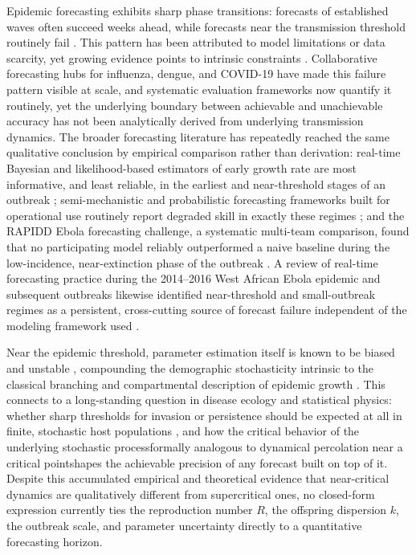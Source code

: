 \documentclass[review]{elsarticle}
\theoremstyle{plain}
\theoremstyle{definition}
\begin{document}
Epidemic forecasting exhibits sharp phase transitions: forecasts of established waves often succeed weeks ahead, while forecasts near the transmission threshold routinely fail \citep{scarpino2019predictability, reich2019collaborative}. This pattern has been attributed to model limitations or data scarcity, yet growing evidence points to intrinsic constraints \citep{farrow2017information, perofsky2017forecasting}. Collaborative forecasting hubs for influenza, dengue, and COVID-19 \citep{mcgowan2019collaborative, johansson2019open, cramer2022evaluation} have made this failure pattern visible at scale, and systematic evaluation frameworks \citep{bracher2021evaluating} now quantify it routinely, yet the underlying boundary between achievable and unachievable accuracy has not been analytically derived from underlying transmission dynamics. The broader forecasting literature has repeatedly reached the same qualitative conclusion by empirical comparison rather than derivation: real-time Bayesian and likelihood-based estimators of early growth rate are most informative, and least reliable, in the earliest and near-threshold stages of an outbreak \citep{bettencourt2008real, white2008likelihood, fraser2007estimating}; semi-mechanistic and probabilistic forecasting frameworks built for operational use routinely report degraded skill in exactly these regimes \citep{funk2018realtime, held2017probabilistic}; and the RAPIDD Ebola forecasting challenge, a systematic multi-team comparison, found that no participating model reliably outperformed a naive baseline during the low-incidence, near-extinction phase of the outbreak \citep{viboud2018rapidd}. A review of real-time forecasting practice during the 2014--2016 West African Ebola epidemic and subsequent outbreaks likewise identified near-threshold and small-outbreak regimes as a persistent, cross-cutting source of forecast failure independent of the modeling framework used \citep{desai2019realtime}.

Near the epidemic threshold, parameter estimation itself is known to be biased and unstable \citep{britton2019estimation}, compounding the demographic stochasticity intrinsic to the classical branching and compartmental description of epidemic growth \citep{kermack1927contribution}. This connects to a long-standing question in disease ecology and statistical physics: whether sharp thresholds for invasion or persistence should be expected at all in finite, stochastic host populations \citep{lloydsmith2005should}, and how the critical behavior of the underlying stochastic process\textemdash formally analogous to dynamical percolation near a critical point\citep{grassberger1983critical}\textemdash shapes the achievable precision of any forecast built on top of it. Despite this accumulated empirical and theoretical evidence that near-critical dynamics are qualitatively different from supercritical ones, no closed-form expression currently ties the reproduction number $R$, the offspring dispersion $k$, the outbreak scale, and parameter uncertainty directly to a quantitative forecasting horizon.
\end{document}
